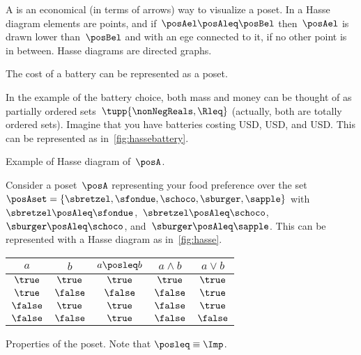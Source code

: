 
A \emph{} is an economical (in terms of arrows) way to visualize a poset.
In a Hasse diagram elements are points, and if~$\posAel \posAleq \posBel$ then~$\posAel$ is drawn lower than~$\posBel$ and with an ege connected to it, if no other point is in between.
Hasse diagrams are directed graphs.

\begin{marginfigure}
    \centering
    \caption{The cost of a battery can be represented as a poset.}
    \label{fig:hassebattery}
\end{marginfigure}

In the example of the battery choice, both mass and money can be thought of as partially ordered sets~$\tupp{\nonNegReals,\Rleq}$ (actually, both are totally ordered sets).
Imagine that you have batteries costing \unit[10]{USD}, \unit[20]{USD}, and \unit[30]{USD}.
This can be represented as in~\cref{fig:hassebattery}.

\begin{marginfigure}
    \centering
    \caption{Example of Hasse diagram of~$\posA$.}
    \label{fig:hasse}
\end{marginfigure}

\begin{example}
    Consider a poset~$\posA$ representing your food preference over the set~$\posAset=\{\sbretzel,\sfondue,\schoco,\sburger,\sapple\}$ with~$\sbretzel\posAleq \sfondue$,~$\sbretzel\posAleq \schoco$,~$\sburger\posAleq \schoco$, and~$\sburger\posAleq \sapple$.
    This can be represented with a Hasse diagram as in~\cref{fig:hasse}.
\end{example}

\begin{marginfigure}
    \centering
    \caption{}
    \label{fig:boolean}
\end{marginfigure}

\begin{margintable}
    \centering
    \begin{tabular}{cc|ccc}
        $a$      & $b$      & $a \posleq  b$ & $a \wedge b$ & $a \vee b$ \\ \hline
        $\true$  & $\true$  & $\true$        & $\true$      & $\true$    \\
        $\true$  & $\false$ & $\false$       & $\false$     & $\true$    \\
        $\false$ & $\true$  & $\true$        & $\false$     & $\true$    \\
        $\false$ & $\false$ & $\true$        & $\false$     & $\false$
    \end{tabular}
    \caption{Properties of the \Bool poset.
        Note that $\posleq \equiv \Imp$.
    }
    \label{tab:boolposet}
\end{margintable}

